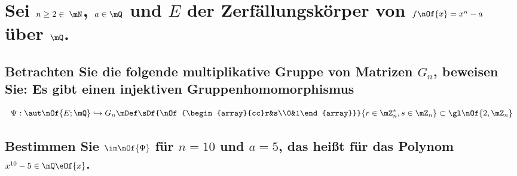 \section{Sei $n\geq 2 \in\;\mN$, $a\in\mQ$ und $E$ der Zerfällungskörper von $f\nOf{x}=x^n-a$ über $\mQ$.}
\subsection{Betrachten Sie die folgende multiplikative Gruppe von Matrizen $G_n$, beweisen Sie: Es gibt einen injektiven Gruppenhomomorphismus}
\begin{equation}
	\Psi:\aut\nOf{E;\mQ} \hookrightarrow G_n\mDef\sDf{\nOf{\begin{array}{cc}r&s\\0&1\end{array}}}{r\in\mZ^*_n,s\in\mZ_n}\subset\gl\nOf{2,\mZ_n}
\end{equation}

\subsection{Bestimmen Sie $\im\nOf{\Psi}$ für $n=10$ und $a=5$, das heißt für das Polynom $x^{10}-5\in\mQ\eOf{x}$.}